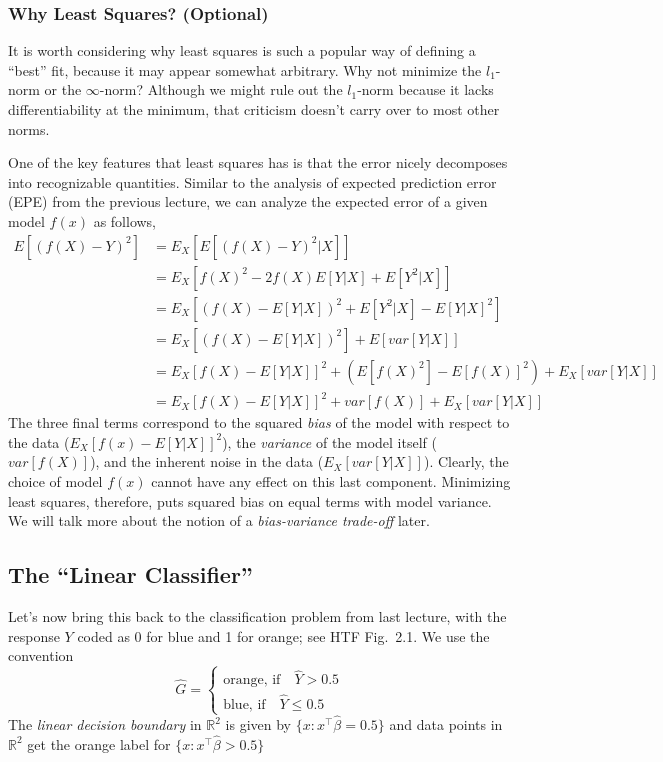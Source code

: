 \documentclass[a4paper]{article}
\begin{document}
\subsubsection{Why Least Squares? (Optional)}

It is worth considering why least squares is such a popular way of defining a ``best'' fit, because it may appear somewhat arbitrary.  Why not minimize the $l_1$-norm or the $\infty$-norm?  Although we might rule out the $l_1$-norm because it lacks differentiability at the minimum, that criticism doesn't carry over to most other norms.

One of the key features that least squares has is that the error nicely decomposes into recognizable quantities.  Similar to the analysis of expected prediction error (EPE) from the previous lecture, we can analyze the expected error of a given model $f(x)$ as follows,
\begin{align*}
E[(f(X) - Y)^2] &= E_X[E[(f(X) - Y)^2 | X]]\\
&= E_X[f(X)^2 -2 f(X)E[Y|X] + E[Y^2|X]]\\
&= E_X[(f(X) - E[Y|X])^2 + E[Y^2|X] - E[Y|X]^2]\\
&= E_X[(f(X) - E[Y|X])^2] + E[var[Y|X]]\\
&= E_X[f(X) - E[Y|X]]^2 + (E[f(X)^2] - E[f(X)]^2) + E_X[var[Y|X]]\\
&= E_X[f(X) - E[Y|X]]^2 + var[f(X)] + E_X[var[Y|X]]
\end{align*}
The three final terms correspond to the squared \emph{bias} of the model with respect to the data ($E_X[f(x) - E[Y|X]]^2$), the \emph{variance} of the model itself ($var[f(X)]$), and the inherent noise in the data ($E_X[var[Y|X]]$).  Clearly, the choice of model $f(x)$ cannot have any effect on this last component.  Minimizing least squares, therefore, puts squared bias on equal terms with model variance. We will talk more about the notion of a \emph{bias-variance trade-off} later.

\subsection{The ``Linear Classifier''}
\label{sec:linclass}
Let's now bring this back to the classification problem from last lecture, with the response $Y$ coded as 0 for blue and 1 for orange; see HTF Fig.\ 2.1.  We use the convention
$$\hat{G}=\left\{\begin{array}{c}\text{orange, if}\quad\hat{Y}>0.5\\\text{blue, if}\quad\hat{Y}\le 0.5\end{array}\right.$$
The \emph{linear decision boundary} in $\mathbb{R}^2$ is given by $\{x:x^\top\hat{\beta}=0.5\}$ and data points in $\mathbb{R}^2$ get the orange label for $\{x:x^\top\hat{\beta}>0.5\}$
\end{document}
